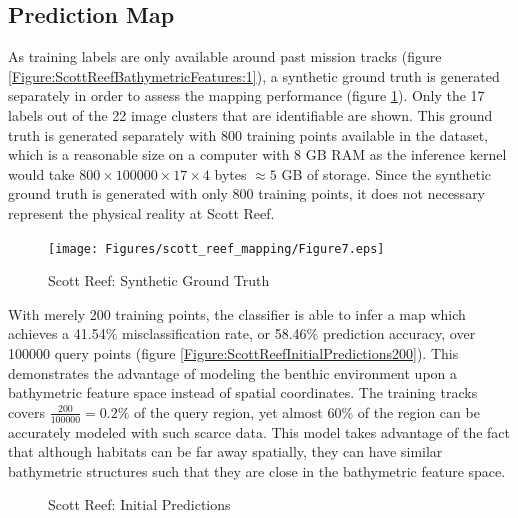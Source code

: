 		\subsection{Prediction Map}
		\label{BenthicHabitatMapping:ScottReef:Maps}

			As training labels are only available around past mission tracks (figure \ref{Figure:ScottReefBathymetricFeatures:1}), a synthetic ground truth is generated separately in order to assess the mapping performance (figure \ref{Figure:ScottReefSyntheticGroundTruth}). Only the 17 labels out of the 22 image clusters that are identifiable are shown. This ground truth is generated separately with 800 training points available in the dataset, which is a reasonable size on a computer with 8 GB RAM as the inference kernel would take $800 \times 100000 \times 17 \times 4$ bytes $\approx 5$ GB of storage. Since the synthetic ground truth is generated with only 800 training points, it does not necessary represent the physical reality at Scott Reef. 
	
			\begin{figure}[!htbp]
			\centering
				\texttt{[image: Figures/scott\_reef\_mapping/Figure7.eps]}
			\caption{Scott Reef: Synthetic Ground Truth}
			\label{Figure:ScottReefSyntheticGroundTruth}
			\end{figure}
			
			With merely 200 training points, the classifier is able to infer a map which achieves a 41.54\% misclassification rate, or 58.46\% prediction accuracy, over 100000 query points (figure \ref{Figure:ScottReefInitialPredictions200}). This demonstrates the advantage of modeling the benthic environment upon a bathymetric feature space instead of spatial coordinates. The training tracks covers $\frac{200}{100000} = 0.2\%$ of the query region, yet almost 60\% of the region can be accurately modeled with such scarce data. This model takes advantage of the fact that although habitats can be far away spatially, they can have similar bathymetric structures such that they are close in the bathymetric feature space.
			
			\begin{figure}[!htbp]
			\centering
			\caption{Scott Reef: Initial Predictions}
			\label{Figure:ScottReefInitialPredictions}
			\end{figure}


